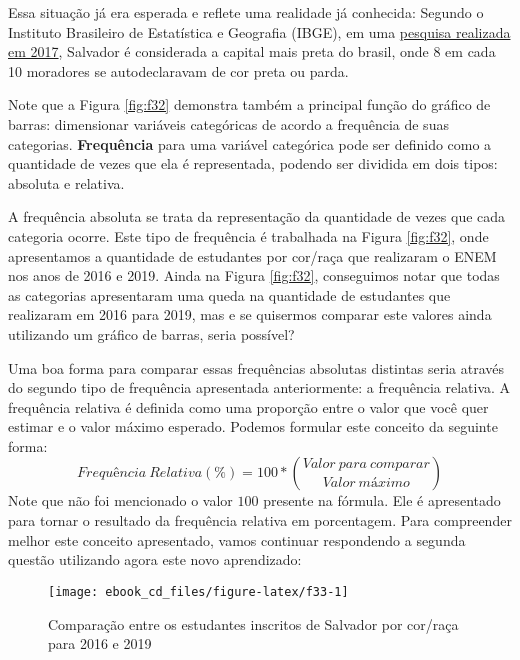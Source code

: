 \documentclass[
  oneside]{book}
\begin{document}
Essa situação já era esperada e reflete uma realidade já conhecida: Segundo o Instituto Brasileiro de Estatística e Geografia (IBGE), em uma \href{https://www.acordacidade.com.br/noticias/203087/ibge-ba-salvador-a-capital-mais-negra-do-brasil-e-com-a-maior-desigualdade-salarial-entre-brancos-e-pretos.html?mobile=true}{pesquisa realizada em 2017}, Salvador é considerada a capital mais preta do brasil, onde 8 em cada 10 moradores se autodeclaravam de cor preta ou parda.

Note que a Figura \ref{fig:f32} demonstra também a principal função do gráfico de barras: dimensionar variáveis categóricas de acordo a frequência de suas categorias. \textbf{Frequência} para uma variável categórica pode ser definido como a quantidade de vezes que ela é representada, podendo ser dividida em dois tipos: absoluta e relativa.

A frequência absoluta se trata da representação da quantidade de vezes que cada categoria ocorre. Este tipo de frequência é trabalhada na Figura \ref{fig:f32}, onde apresentamos a quantidade de estudantes por cor/raça que realizaram o ENEM nos anos de 2016 e 2019. Ainda na Figura \ref{fig:f32}, conseguimos notar que todas as categorias apresentaram uma queda na quantidade de estudantes que realizaram em 2016 para 2019, mas e se quisermos comparar este valores ainda utilizando um gráfico de barras, seria possível?

Uma boa forma para comparar essas frequências absolutas distintas seria através do segundo tipo de frequência apresentada anteriormente: a frequência relativa. A frequência relativa é definida como uma proporção entre o valor que você quer estimar e o valor máximo esperado. Podemos formular este conceito da seguinte forma:
\[Frequência\ Relativa (\%) = 100*{Valor\ para\ comparar \choose Valor\ máximo}\]
Note que não foi mencionado o valor \(100\) presente na fórmula. Ele é apresentado para tornar o resultado da frequência relativa em porcentagem. Para compreender melhor este conceito apresentado, vamos continuar respondendo a segunda questão utilizando agora este novo aprendizado:

\begin{figure}

{\centering \texttt{[image: ebook\_cd\_files/figure-latex/f33-1]} 

}

\caption{Comparação entre os estudantes inscritos de Salvador por cor/raça para 2016 e 2019}\label{fig:f33}
\end{figure}
\end{document}
